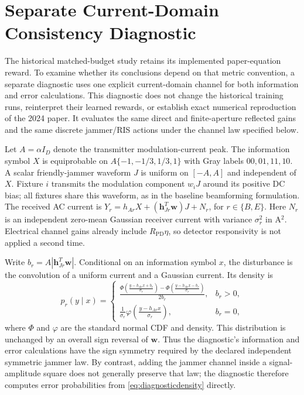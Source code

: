 \section{Separate Current-Domain Consistency Diagnostic}
\label{sec:currentdiagnostic}
The historical matched-budget study retains its implemented paper-equation reward. To examine whether its conclusions depend on that metric convention, a separate diagnostic uses one explicit current-domain channel for both information and error calculations. This diagnostic does not change the historical training runs, reinterpret their learned rewards, or establish exact numerical reproduction of the 2024 paper. It evaluates the same direct and finite-aperture reflected gains and the same discrete jammer/RIS actions under the channel law specified below.

Let $A=\alpha I_D$ denote the transmitter modulation-current peak. The information symbol $X$ is equiprobable on $A\{-1,-1/3,1/3,1\}$ with Gray labels $00,01,11,10$. A scalar friendly-jammer waveform $J$ is uniform on $[-A,A]$ and independent of $X$. Fixture $i$ transmits the modulation component $w_iJ$ around its positive DC bias; all fixtures share this waveform, as in the baseline beamforming formulation. The received AC current is $Y_r=h_{Ar}X+(\mathbf{h}_{Jr}^{T}\mathbf{w})J+N_r$, for $r\in\{B,E\}$. Here $N_r$ is an independent zero-mean Gaussian receiver current with variance $\sigma_r^2$ in A$^2$. Electrical channel gains already include $R_{\mathrm{PD}}\eta$, so detector responsivity is not applied a second time.

Write $b_r=A|\mathbf{h}_{Jr}^{T}\mathbf{w}|$. Conditional on an information symbol $x$, the disturbance is the convolution of a uniform current and a Gaussian current. Its density is
\begin{equation}
p_r(y\mid x)=
\begin{cases}
\displaystyle\frac{\Phi\!\left(\frac{y-h_{Ar}x+b_r}{\sigma_r}\right)-\Phi\!\left(\frac{y-h_{Ar}x-b_r}{\sigma_r}\right)}{2b_r}, & b_r>0,\\[6pt]
\displaystyle\frac{1}{\sigma_r}\varphi\!\left(\frac{y-h_{Ar}x}{\sigma_r}\right), & b_r=0,
\end{cases}
\label{eq:diagnosticdensity}
\end{equation}
where $\Phi$ and $\varphi$ are the standard normal CDF and density. This distribution is unchanged by an overall sign reversal of $\mathbf{w}$. Thus the diagnostic's information and error calculations have the sign symmetry required by the declared independent symmetric jammer law. By contrast, adding the jammer channel inside a signal-amplitude square does not generally preserve that law; the diagnostic therefore computes error probabilities from \eqref{eq:diagnosticdensity} directly.

